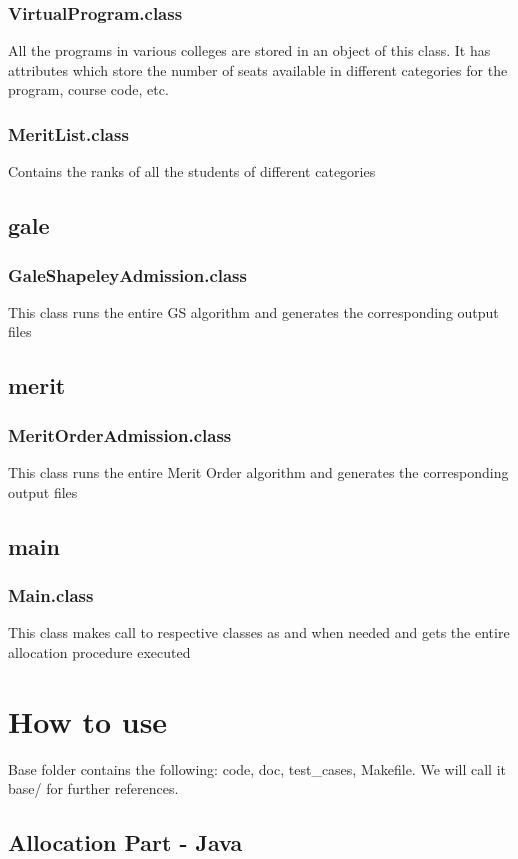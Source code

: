 \documentclass[]{report}
\begin{document}
\subsection{VirtualProgram.class}
All the programs in various colleges are stored in an object of this class. It has attributes which store the number of seats available in different categories for the program, course code, etc.

\subsection{MeritList.class}
Contains the ranks of all the students of different categories

\section{gale}
\subsection{GaleShapeleyAdmission.class}
This class runs the entire GS algorithm and generates the corresponding output files

\section{merit}
\subsection{MeritOrderAdmission.class}
This class runs the entire Merit Order algorithm and generates the corresponding output files

\section{main}
\subsection{Main.class}
This class makes call to respective classes as and when needed and gets the entire allocation procedure executed

\chapter{How to use}
Base folder contains the following: code, doc, test\_cases, Makefile. We will call it base/ for further references.

\section{Allocation Part - Java}
\end{document}
